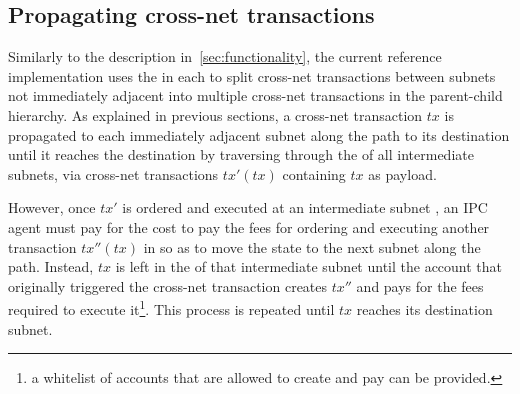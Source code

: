   

\subsection{Propagating cross-net transactions}
\label{sec:cnetrefimpl} 
Similarly to the description in~\cref{sec:functionality}, the current reference implementation uses the \postoffice in each \gw to split cross-net transactions between subnets not immediately adjacent into multiple cross-net transactions in the parent-child hierarchy. As explained in previous sections, a cross-net transaction $tx$ is propagated to each immediately adjacent subnet along the path to its destination until it reaches the destination by traversing through the \postoffice of all intermediate subnets, via cross-net transactions $tx'(tx)$ containing $tx$ as payload. 

However, once $tx'$ is ordered and executed at an intermediate subnet , an IPC agent must pay for the cost to pay the fees for ordering and executing another transaction $tx''(tx)$ in  so as to move the state to the next subnet along the path. Instead, $tx$ is left in the \postoffice of that intermediate subnet until the account that originally triggered the cross-net transaction creates $tx''$ and pays for the fees required to execute it\footnote{a whitelist of accounts that are allowed to create and pay can be provided.}. This process is repeated until $tx$ reaches its destination subnet.


